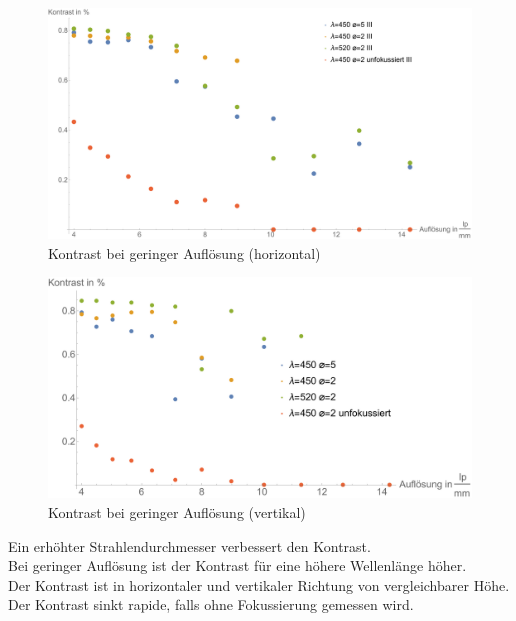 \begin{minipage}{\linewidth}
\begin{figure}[H]
	\centering
\includegraphics[width=1.0\linewidth]{IMAGE/Versuch2Plot1horizontal2.pdf}
	\caption{Kontrast bei geringer Auflösung (horizontal)}
	\label{fig:Versuch2_Plot2h1}
\end{figure} 

\begin{figure}[H]
	\centering
\includegraphics[width=1.0\linewidth]{IMAGE/Versuch2Plot1vertikal2.pdf}
	\caption{Kontrast bei geringer Auflösung (vertikal)}
	\label{fig:Versuch2_Plot2v1}
\end{figure} 

Ein erhöhter Strahlendurchmesser verbessert den Kontrast.\\
Bei geringer Auflösung ist der Kontrast für eine höhere Wellenlänge höher.\\
Der Kontrast ist in horizontaler und vertikaler Richtung von vergleichbarer Höhe.\\
Der Kontrast sinkt rapide, falls ohne Fokussierung gemessen wird.

\end{minipage}

